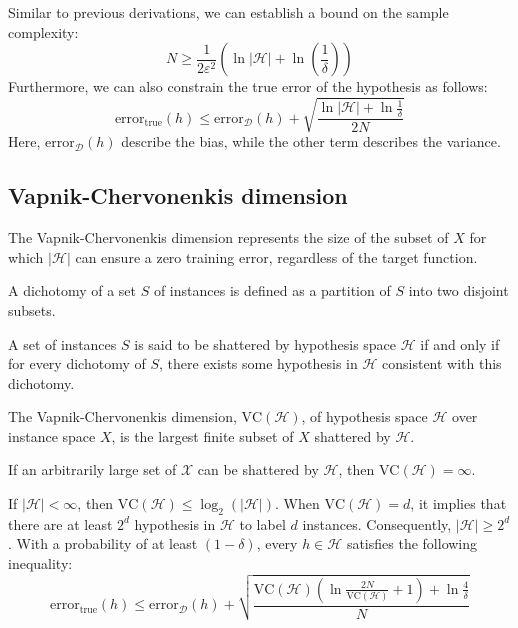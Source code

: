Similar to previous derivations, we can establish a bound on the sample complexity:
\[N\geq\dfrac{1}{2\varepsilon^2}\left(\ln\left\lvert \mathcal{H}\right\rvert+\ln\left(\dfrac{1}{\delta}\right)\right)\]
Furthermore, we can also constrain the true error of the hypothesis as follows:
\[\text{error}_{\text{true}}(h)\leq \text{error}_{\mathcal{D}}(h)+\sqrt{\dfrac{\ln\left\lvert \mathcal{H} \right\rvert+\ln\frac{1}{\delta}}{2N}}\]
Here, $\text{error}_{\mathcal{D}}(h)$ describe the bias, while the other term describes the variance. 

\subsection{Vapnik-Chervonenkis dimension}
The Vapnik-Chervonenkis dimension represents the size of the subset of $X$ for which $\left\lvert \mathcal{H}\right\rvert$ can ensure a zero training error, regardless of the target function. 
\begin{definition}
    A dichotomy of a set $S$ of instances is defined as a partition of $S$ into two disjoint subsets. 
\end{definition}
\begin{definition}
    A set of instances $S$ is said to be shattered by hypothesis space $\mathcal{H}$ if and only if for every dichotomy of $S$, there exists some hypothesis in $\mathcal{H}$ consistent with this dichotomy.
\end{definition}
\begin{definition}
    The Vapnik-Chervonenkis dimension, $\text{VC}(\mathcal{H})$, of hypothesis space $\mathcal{H}$ over instance space $X$, is the largest finite subset of $X$ shattered by $\mathcal{H}$.
\end{definition}
If an arbitrarily large set of $\mathcal{X}$ can be shattered by $\mathcal{H}$, then $\text{VC}(\mathcal{H})=\infty$.

If $\left\lvert \mathcal{H}\right\rvert < \infty$, then $\text{VC}(\mathcal{H}) \leq \log_2(\left\lvert \mathcal{H}\right\rvert)$.
When $\text{VC}(\mathcal{H})=d$, it implies that there are at least $2^d$ hypothesis in $\mathcal{H}$ to label $d$ instances. 
Consequently, $\left\lvert \mathcal{H}\right\rvert \geq 2^d$.
With a probability of at least $(1-\delta)$, every $h\in \mathcal{H}$ satisfies the following inequality:
\[\text{error}_{\text{true}}(h)\leq \text{error}_{\mathcal{D}}(h)+\sqrt{\dfrac{\text{VC}(\mathcal{H})\left(\ln\frac{2N}{\text{VC}(\mathcal{H})}+1\right)+\ln\frac{4}{\delta}}{N}}\]
